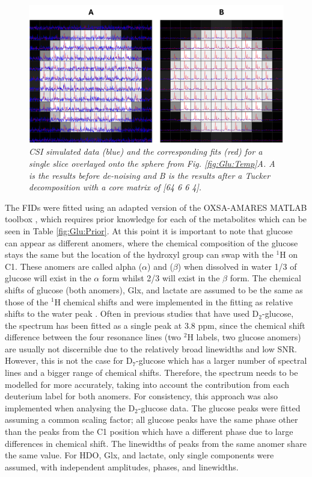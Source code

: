 \begin{figure}
   \centering
   \includegraphics[width = 1\textwidth]{Figures/Glucose/DeNoise_Spectra.png}
   \caption{\textit{\ac{CSI} simulated data (blue) and the corresponding fits (red) for a single slice overlayed onto the sphere from Fig. \ref{fig:Glu:Temp}A. A is the results before de-noising and B is the results after a Tucker decomposition with a core matrix of [64 6 6 4].}}
   \label{fig:Glu:DeNoise_spectra}
\end{figure}

The \ac{FID}s were fitted using an adapted version of the OXSA-\ac{AMARES} MATLAB toolbox \cite{Vanhamme1997ImprovedKnowledge, Purvis2017OXSA:MATLAB}, which requires prior knowledge for each of the metabolites which can be seen in Table \ref{fig:Glu:Prior}. At this point it is important to note that glucose can appear as different anomers, where the chemical composition of the glucose stays the same but the location of the hydroxyl group can swap with the $^1$H on C1. These anomers are called alpha ($\alpha$) and ($\beta$) when dissolved in water 1/3 of glucose will exist in the $\alpha$ form whilst 2/3 will exist in the $\beta$ form. The chemical shifts of glucose (both anomers), Glx, and lactate are assumed to be the same as those of the $^1$H chemical shifts \cite{Govindaraju2000ProtonMetabolites} and were implemented in the fitting as relative shifts to the water peak \cite{Meerwaldt2023InImaging}. Often in previous studies that have used D$_2$-glucose, the spectrum has been fitted as a single peak at 3.8 ppm, since the chemical shift difference between the four resonance lines (two $^2$H labels, two glucose anomers) are usually not discernible due to the relatively broad linewidths and low SNR. However, this is not the case for D$_7$-glucose \cite{Govindaraju2000ProtonMetabolites} which has a larger number of spectral lines and a bigger range of chemical shifts. Therefore, the spectrum needs to be modelled for more accurately, taking into account the contribution from each deuterium label for both anomers. For consistency, this approach was also implemented when analysing the D$_2$-glucose data. The glucose peaks were fitted assuming a common scaling factor; all glucose peaks have the same phase other than the peaks from the C1 position which have a different phase due to large differences in chemical shift. The linewidths of peaks from the same anomer share the same value. For \ac{HDO}, Glx, and lactate, only single components were assumed, with independent amplitudes, phases, and linewidths.

